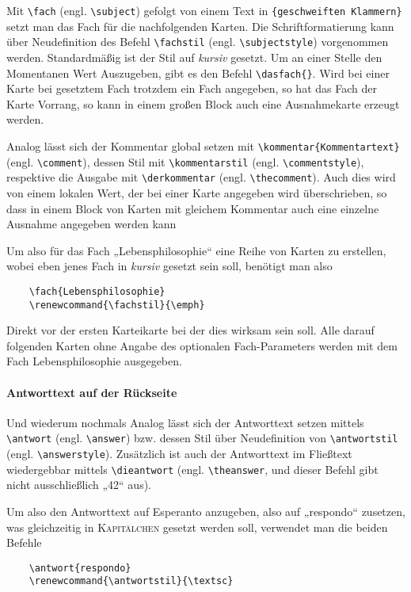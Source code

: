 \documentclass[a4paper]{article}
\begin{document}
Mit \lstinline!\fach! (engl. \lstinline!\subject!) gefolgt von einem Text in \lstinline!{geschweiften Klammern}! setzt man das Fach für die nachfolgenden Karten. Die Schriftformatierung kann über Neudefinition des Befehl \lstinline!\fachstil! (engl. \lstinline!\subjectstyle!) vorgenommen werden. Standardmäßig ist der Stil auf \emph{kursiv} gesetzt. Um an einer Stelle den Momentanen Wert Auszugeben, gibt es den Befehl \lstinline!\dasfach{}!. Wird bei einer Karte bei gesetztem Fach trotzdem ein Fach angegeben, so hat das Fach der Karte Vorrang, so kann in einem großen Block auch eine Ausnahmekarte erzeugt werden.

Analog lässt sich der Kommentar global setzen mit \lstinline!\kommentar{Kommentartext}! (engl. \lstinline!\comment!), dessen Stil mit \lstinline!\kommentarstil! (engl. \lstinline!\commentstyle!), respektive die Ausgabe mit \lstinline!\derkommentar! (engl. \lstinline!\thecomment!). Auch dies wird von einem lokalen Wert, der bei einer Karte angegeben wird überschrieben, so dass in einem Block von Karten mit gleichem Kommentar auch eine einzelne Ausnahme angegeben werden kann

Um also für das Fach „Lebensphilosophie“ eine Reihe von Karten zu erstellen, wobei eben jenes Fach in \emph{kursiv} gesetzt sein soll, benötigt man also
\begin{lstlisting}
	\fach{Lebensphilosophie}
	\renewcommand{\fachstil}{\emph}
\end{lstlisting}
Direkt vor der ersten Karteikarte bei der dies wirksam sein soll. Alle darauf folgenden Karten ohne Angabe des optionalen Fach-Parameters werden mit dem Fach Lebensphilosophie ausgegeben.

\paragraph{Antworttext auf der Rückseite}\label{par:Antwort} Und wiederum nochmals Analog lässt sich der Antworttext setzen mittels \lstinline!\antwort! (engl. \lstinline!\answer!) bzw. dessen Stil über Neudefinition von \lstinline!\antwortstil! (engl. \lstinline!\answerstyle!). Zusätzlich ist auch der Antworttext im Fließtext wiedergebbar mittels \lstinline!\dieantwort! (engl. \lstinline!\theanswer!, und dieser Befehl gibt nicht ausschließlich „42“ aus).

Um also den Antworttext auf Esperanto anzugeben, also auf „respondo“ zusetzen, was gleichzeitig in \textsc{Kapitälchen} gesetzt werden soll, verwendet man die beiden Befehle
\begin{lstlisting}
	\antwort{respondo}
	\renewcommand{\antwortstil}{\textsc}
\end{lstlisting}
\end{document}
